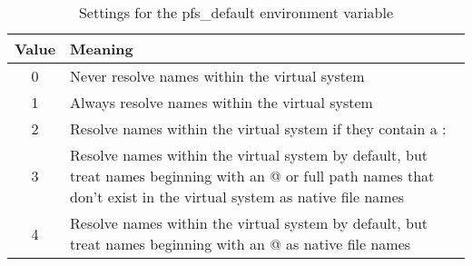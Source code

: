 \begin{table}[h]
\begin{center}
\caption{Settings for the {\sc pfs\_default} environment variable}
\vspace{0.1in}
\begin{tabular}{|c|p{3.9in}|} \hline
Value & Meaning \\ \hline \hline
0 & Never resolve names within the virtual system \\ \hline 
1 & Always resolve names within the virtual system \\ \hline 
2 & Resolve names within the virtual system if they contain a : \\ \hline 
3 & Resolve names within the virtual system by default, but 
treat names beginning with an @ or full path names that 
don't exist in the virtual system as native file names \\ \hline 
4 & Resolve names within the virtual system by default, but 
treat names beginning with an @ as native file names \\ \hline
\end{tabular}
\vspace{-0.1in}
\end{center}
\end{table}


